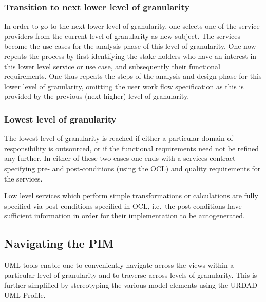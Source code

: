\documentclass{IOS-Book-Article}
\begin{document}

\subsubsection{Transition to next lower level of granularity}

In order to go to the next lower level of granularity, one
selects one of the service providers from the current level of granularity
as new subject. The services become the use cases for the analysis phase
of this level of granularity. One now repeats the process by first identifying
the stake holders who have an interest in this lower level service or use case,
and subsequently their functional requirements.
One thus repeats the steps of the analysis and design phase for this lower
level of granularity, omitting the user work flow specification as this is
provided by the previous (next higher) level of granularity.


\subsubsection{Lowest level of granularity}

The lowest level of granularity is reached if either a particular domain
of responsibility is outsourced, or if the functional requirements need not be
refined any further. In either of these two cases one ends with a services
contract specifying pre- and post-conditions (using the OCL) and quality
requirements for the services.

Low level services which perform simple transformations or calculations are
fully specified via post-conditions specified in OCL, i.e.\ the post-conditions
have sufficient information in order for their implementation to be autogenerated.

\subsection{Navigating the PIM}

UML tools enable one to conveniently navigate across the views within a particular level of granularity and to traverse across levels of granularity. This is further simplified
by stereotyping the various model elements using the URDAD UML Profile.

\end{document}
